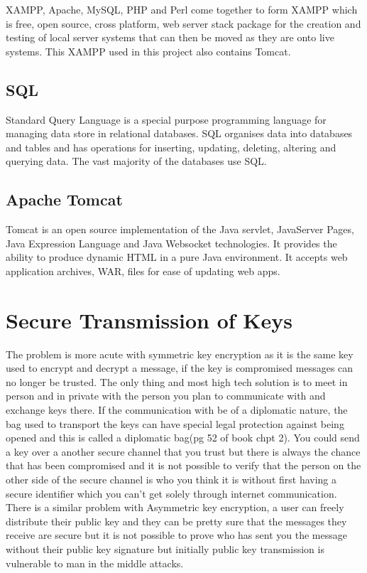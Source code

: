 XAMPP, Apache, MySQL, PHP and Perl come together to form XAMPP which is free, open source, cross platform, web server stack package for the creation and testing of local server systems that can then be moved as they are onto live systems. This XAMPP used in this project also contains Tomcat.

\subsection{SQL}

Standard Query Language is a special purpose programming language for managing data store in relational databases. SQL organises data into databases and tables and has operations for inserting, updating, deleting, altering and querying data. The vast majority of the databases use SQL.

\subsection{Apache Tomcat}

Tomcat is an open source implementation of the Java servlet, JavaServer Pages, Java Expression Language and Java Websocket technologies. It provides the ability to produce dynamic HTML in a pure Java environment. It accepts web application archives, WAR, files for ease of updating web apps.

\section{Secure Transmission of Keys}

The problem is more acute with symmetric key encryption as it is the same key used to encrypt and decrypt a message, if the key is compromised messages can no longer be trusted. The only thing and most high tech solution is to meet in person and in private with the person you plan to communicate with and exchange keys there. If the communication with be of a diplomatic nature, the bag used to transport the keys can have special legal protection against being opened and this is called a diplomatic bag(pg 52 of book chpt 2). You could send a key over a another secure channel that you trust but there is always the chance that has been compromised and it is not possible to verify that the person on the other side of the secure channel is who you think it is without first having a secure identifier which you can't get solely through internet communication. There is a similar problem with Asymmetric key encryption, a user can freely distribute their public key and they can be pretty sure that the messages they receive are secure but it is not possible to prove who has sent you the message without their public key signature but initially public key transmission is vulnerable to man in the middle attacks.

